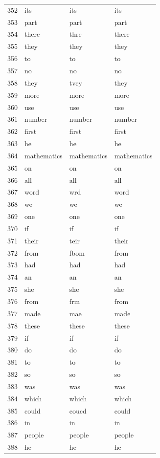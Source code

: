 \begin{longtable}{clll}
    352 & its & its & its \\
    353 & part & part & part \\
    354 & there & thre & there \\
    355 & they & they & they \\
    356 & to & to & to \\
    357 & no & no & no \\
    358 & they & tvey & they \\
    359 & more & more & more \\
    360 & use & use & use \\
    361 & number & number & number \\
    362 & first & first & first \\
    363 & he & he & he \\
    364 & mathematics & mathematics & mathematics \\
    365 & on & on & on \\
    366 & all & all & all \\
    367 & word & wrd & word \\
    368 & we & we & we \\
    369 & one & one & one \\
    370 & if & if & if \\
    371 & their & teir & their \\
    372 & from & fbom & from \\
    373 & had & had & had \\
    374 & an & an & an \\
    375 & she & she & she \\
    376 & from & frm & from \\
    377 & made & mae & made \\
    378 & these & these & these \\
    379 & if & if & if \\
    380 & do & do & do \\
    381 & to & to & to \\
    382 & so & so & so \\
    383 & was & was & was \\
    384 & which & which & which \\
    385 & could & coucd & could \\
    386 & in & in & in \\
    387 & people & people & people \\
    388 & he & he & he \\

\end{longtable}
